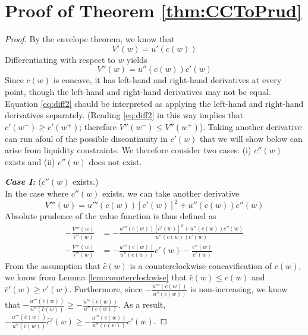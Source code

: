\section{Proof of Theorem \ref{thm:CCToPrud}} \label{app:CCToPrud}
\begin{proof}
	By the envelope theorem, we know that
	\[ V'(w) = u'(c(w))\]
	Differentiating with respect to $w$ yields
	\begin{equation}\label{eq:diff2}
	V''(w) = u''(c(w))c'(w)
	\end{equation}
	Since $c(w)$ is concave, it has left-hand and right-hand derivatives at every point, though the left-hand and right-hand derivatives may not be equal. Equation \eqref{eq:diff2} should be interpreted as applying the left-hand and right-hand derivatives separately. (Reading \eqref{eq:diff2} in this way implies that $c'(w^-) \geq c'(w^+)$; therefore $V''(w^-) \leq V''(w^+)$). Taking another derivative can run afoul of the possible discontinuity in $c'(w)$ that we will show below can arise from liquidity constraints. We therefore consider two cases: (i) $c''(w)$ exists and (ii) $c''(w)$ does not exist.
	
	\bigskip
	\noindent \textbf{\textit{Case I:}} ($c''(w)$ exists.)\\
	In the case where $c''(w)$ exists, we can take another derivative
	\[V'''(w) = u'''(c(w))[c'(w)]^2 + u''(c(w))c''(w)\]
	Absolute prudence of the value function is thus defined as
	\begin{align}-\frac{V'''(w)}{V''(w)} &= -\frac{u'''(c(w))[c'(w)]^2 + u''(c(w))c''(w)}{u''(c(w))c'(w)} \nonumber \\
	-\frac{V'''(w)}{V''(w)} &= -\frac{u'''(c(w))}{u''(c(w))}c'(w) - \frac{c''(w)}{c'(w)}\label{eq:absprudence}\end{align}
	From the assumption that $\hat{c}(w)$ is a counterclockwise concavification of $c(w)$, we know from Lemma \ref{lem:counterclockwise} that  $\hat{c}(w) \leq c(w)$ and $\hat{c}'(w) \geq c'(w)$. Furthermore, since $-\frac{u'''(c(w))}{u''(c(w))}$ is non-increasing, we know that $-\frac{u'''(\hat{c}(w))}{u''(\hat{c}(w))} \geq -\frac{u'''(c(w))}{u''(c(w))}$. As a result, $-\frac{u'''(\hat{c}(w))}{u''(\hat{c}(w))}\hat{c}'(w) \geq -\frac{u'''(c(w))}{u''(c(w))}c'(w)$.
	

\end{proof}
